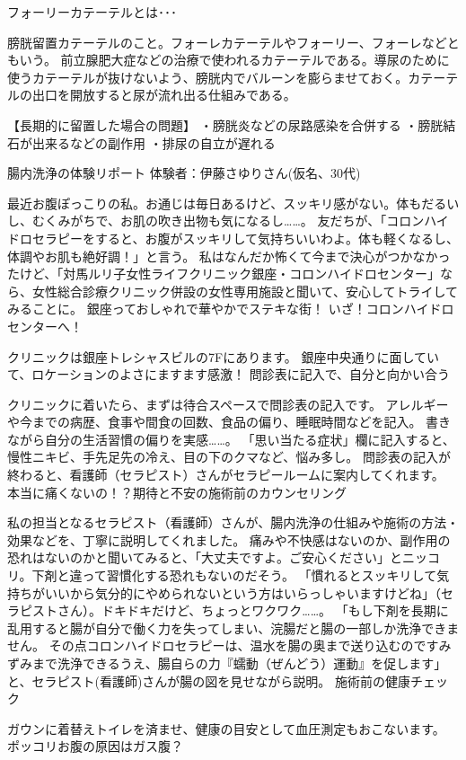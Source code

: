フォーリーカテーテルとは･･･

膀胱留置カテーテルのこと。フォーレカテーテルやフォーリー、フォーレなどともいう。
前立腺肥大症などの治療で使われるカテーテルである。導尿のために使うカテーテルが抜けないよう、膀胱内でバルーンを膨らませておく。カテーテルの出口を開放すると尿が流れ出る仕組みである。

【長期的に留置した場合の問題】
・膀胱炎などの尿路感染を合併する
・膀胱結石が出来るなどの副作用
・排尿の自立が遅れる


腸内洗浄の体験リポート
体験者：伊藤さゆりさん(仮名、30代)

最近お腹ぽっこりの私。お通じは毎日あるけど、スッキリ感がない。体もだるいし、むくみがちで、お肌の吹き出物も気になるし……。
友だちが、「コロンハイドロセラピーをすると、お腹がスッキリして気持ちいいわよ。体も軽くなるし、体調やお肌も絶好調！」と言う。
私はなんだか怖くて今まで決心がつかなかったけど、「対馬ルリ子女性ライフクリニック銀座・コロンハイドロセンター」なら、女性総合診療クリニック併設の女性専用施設と聞いて、安心してトライしてみることに。
銀座っておしゃれで華やかでステキな街！
いざ！コロンハイドロセンターへ！

クリニックは銀座トレシャスビルの7Fにあります。
銀座中央通りに面していて、ロケーションのよさにますます感激！
問診表に記入で、自分と向かい合う

クリニックに着いたら、まずは待合スペースで問診表の記入です。 アレルギーや今までの病歴、食事や間食の回数、食品の偏り、睡眠時間などを記入。
書きながら自分の生活習慣の偏りを実感……。
「思い当たる症状」欄に記入すると、慢性ニキビ、手先足先の冷え、目の下のクマなど、悩み多し。
問診表の記入が終わると、看護師（セラピスト）さんがセラピールームに案内してくれます。
本当に痛くないの！？期待と不安の施術前のカウンセリング

私の担当となるセラピスト（看護師）さんが、腸内洗浄の仕組みや施術の方法・効果などを、丁寧に説明してくれました。
痛みや不快感はないのか、副作用の恐れはないのかと聞いてみると、「大丈夫ですよ。ご安心ください」とニッコリ。下剤と違って習慣化する恐れもないのだそう。
「慣れるとスッキリして気持ちがいいから気分的にやめられないという方はいらっしゃいますけどね」（セラピストさん）。ドキドキだけど、ちょっとワクワク……。
「もし下剤を長期に乱用すると腸が自分で働く力を失ってしまい、浣腸だと腸の一部しか洗浄できません。
その点コロンハイドロセラピーは、温水を腸の奥まで送り込むのですみずみまで洗浄できるうえ、腸自らの力『蠕動（ぜんどう）運動』を促します」と、セラピスト(看護師)さんが腸の図を見せながら説明。
施術前の健康チェック

ガウンに着替えトイレを済ませ、健康の目安として血圧測定もおこないます。
ポッコリお腹の原因はガス腹？

